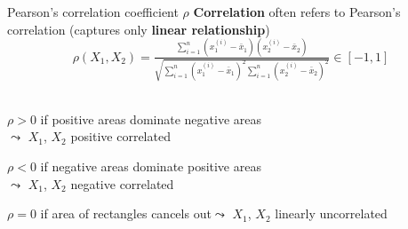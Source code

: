 \documentclass[10pt,compress,t,notes=noshow, xcolor=table]{beamer}
\begin{document}
\begin{frame}[t]{Pearson's correlation coefficient $\rho$}
\textbf{Correlation} often refers to Pearson's correlation (captures only \textbf{linear relationship})\\
$$\rho(X_1, X_2) = \tfrac{\sum_{i=1}^{n}(x_1^{(i)}-\bar{x}_1)(x_2^{(i)}-\bar{x}_2)}{\sqrt{\sum_{i=1}^{n}(x_1^{(i)}-\bar{x}_1)^2 \sum_{i=1}^{n}(x_2^{(i)}-\bar{x}_2)^2}} \in [-1, 1]$$
\spacer[0.125]
\\
\pause
\begin{itemizeM}
\item $\rho > 0$ if {\color{ggblue}positive areas} dominate {\color{ggred}negative areas}\\
$\leadsto$ $X_1$, $X_2$ positive correlated
\item $\rho < 0$ if {\color{ggred}negative areas} dominate {\color{ggblue}positive areas}\\
$\leadsto$ $X_1$, $X_2$ negative correlated
\item $\rho = 0$ if area of rectangles cancels out$\leadsto$ $X_1$, $X_2$ linearly uncorrelated
\end{itemizeM}
\end{frame}
\end{document}
